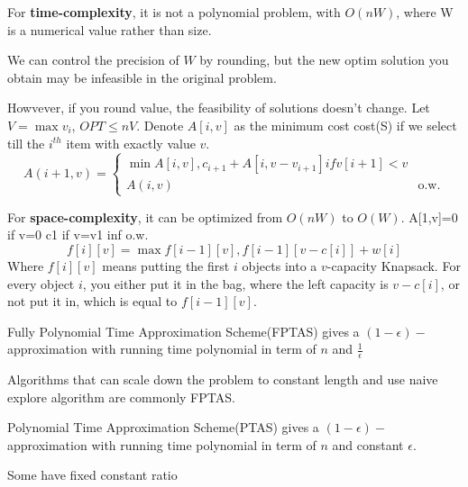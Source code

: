For \textbf{time-complexity}, it is not a polynomial problem, with $O(nW)$, where W is a numerical value rather than size.

We can control the precision of $W$ by rounding, but the new optim solution you obtain may be infeasible in the original problem.

Howvever, if you round value, the feasibility of solutions doesn't change. 
Let $V=\max v_i$, $OPT\leq nV$. Denote $A[i,v]$ as the minimum cost cost(S) if we select till the $i^{th}$ item with exactly value $v$.
\begin{equation}
    A(i+1,v)= 
    \begin{cases}
    \min{A[i,v],c_{i+1}+A[i,v-v_{i+1}]} if v[i+1]<v\\
    A(i,v) & \text{o.w.}
    \end{cases}
\end{equation}

For \textbf{space-complexity}, it can be optimized from $O(nW)$ to $O(W)$.
A[1,v]=0 if v=0
c1 if v=v1
inf o.w.
\[
    f[i][v]=\max{f[i-1][v],f[i-1][v-c[i]]+w[i]}\]
Where $f[i][v]$ means putting the first $i$ objects into a $v$-capacity Knapsack. For every object $i$, you either put it in the bag, where the left capacity is $v-c[i]$, or not put it in, which is equal to $f[i-1][v]$.

\begin{remark}
    Fully Polynomial Time Approximation Scheme(FPTAS) gives a $(1-\epsilon)-$approximation with running time polynomial in term of $n$ and $\frac{1}{\epsilon}$

    Algorithms that can scale down the problem to constant length and use naive explore algorithm are commonly FPTAS.

    Polynomial Time Approximation Scheme(PTAS)
    gives a $(1-\epsilon)-$approximation with running time polynomial in term of $n$ and constant $\epsilon$.

    Some have fixed constant ratio
\end{remark}

